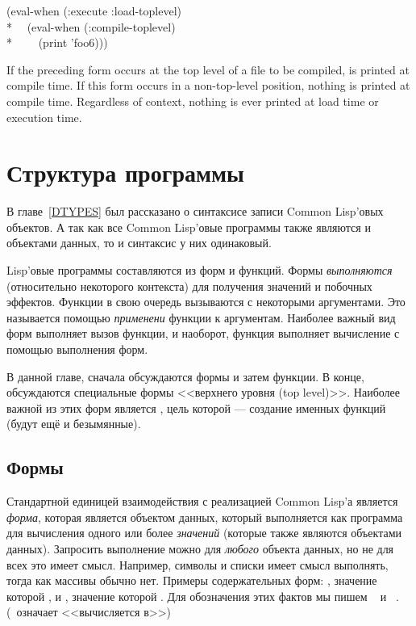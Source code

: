 \begin{defspec}
\begin{lisp}
(eval-when (:execute :load-toplevel) \\*
~~(eval-when (:compile-toplevel) \\*
~~~~(print 'foo6)))
\end{lisp}

    If the preceding form occurs at the top level of a file to be compiled,
        is
       printed at compile time.  If this form occurs in a non-top-level
       position, nothing is printed at compile time. Regardless of context,
       nothing is ever printed at load time or execution time.
\end{defspec}

\else

\chapter{Структура программы}
\label{PROGS}

В главе~\ref{DTYPES} был рассказано о синтаксисе записи Common Lisp'овых объектов.
А так как все Common Lisp'овые программы также являются и объектами данных, то и
синтаксис у них одинаковый.

Lisp'овые программы составляются из форм и функций. Формы \emph{выполняются}
(относительно некоторого контекста) для получения значений и побочных
эффектов. Функции в свою очередь вызываются с некоторыми аргументами. Это
называется помощью \emph{применени} функции к аргументам. 
Наиболее важный вид форм выполняет вызов функции, и наоборот, функция выполняет
вычисление с помощью выполнения форм.

В данной главе, сначала обсуждаются формы и затем функции. В конце, обсуждаются
специальные формы <<верхнего уровня (top level)>>. Наиболее важной из этих форм
является , цель которой --- создание именных функций (будут
ещё и безымянные).

\section{Формы}

Стандартной единицей взаимодействия с реализацией Common Lisp'а является
\emph{форма}, которая является объектом данных, который выполняется как
программа для вычисления одного или более \emph{значений} (которые также
являются объектами данных). Запросить выполнение можно для \emph{любого}
объекта данных, но не для всех это имеет смысл. Например, символы и списки имеет
смысл выполнять, тогда как массивы обычно нет. Примеры содержательных форм:
, значение которой , и , значение которой .
Для обозначения этих фактов мы пишем  \EV\  и  \EV\
. (\EV\ означает <<вычисляется в>>)


